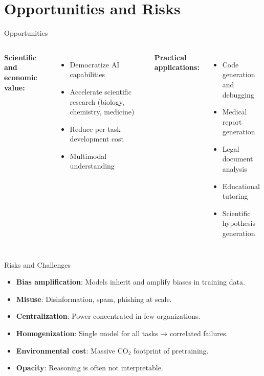 \documentclass[aspectratio=169,10pt]{beamer}
\begin{document}
\section{Opportunities and Risks}


\begin{frame}{Opportunities}
  \begin{columns}[T]
      \textbf{Scientific and economic value:}
      \begin{itemize}
        \item Democratize AI capabilities
        \item Accelerate scientific research (biology, chemistry, medicine)
        \item Reduce per-task development cost
        \item Multimodal understanding
      \end{itemize}
      \textbf{Practical applications:}
      \begin{itemize}
        \item Code generation and debugging
        \item Medical report generation
        \item Legal document analysis
        \item Educational tutoring
        \item Scientific hypothesis generation
      \end{itemize}
  \end{columns}
\end{frame}

\begin{frame}{Risks and Challenges}
  \begin{tcolorbox}[alertbox, title=Key Risks (Bommasani et al.\ 2021)]
    \begin{itemize}
      \item \textbf{Bias amplification}: Models inherit and amplify biases in training data.
      \item \textbf{Misuse}: Disinformation, spam, phishing at scale.
      \item \textbf{Centralization}: Power concentrated in few organizations.
      \item \textbf{Homogenization}: Single model for all tasks → correlated failures.
      \item \textbf{Environmental cost}: Massive CO$_2$ footprint of pretraining.
      \item \textbf{Opacity}: Reasoning is often not interpretable.
    \end{itemize}
  \end{tcolorbox}
\end{frame}
\end{document}
